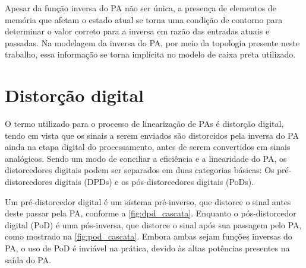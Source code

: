 Apesar da função inversa do PA não ser única, a presença de elementos de memória que afetam o estado atual se torna uma condição de contorno para determinar o valor correto para a inversa em razão das entradas atuais e passadas. Na modelagem da inversa do PA, por meio da topologia presente neste trabalho, essa informação se torna implícita no modelo de caixa preta utilizado.

\section{Distorção digital} \label{sec:fundteo-distor}
O termo utilizado para o processo de linearização de PAs é distorção digital, tendo em vista que os sinais a serem enviados são distorcidos pela inversa do PA ainda na etapa digital do processamento, antes de serem convertidos em sinais analógicos. Sendo um modo de conciliar a eficiência e a linearidade do PA, os distorcedores digitais podem ser separados em duas categorias básicas: Os pré-distorcedores digitais (DPDs) e os pós-distorcedores digitais (PoDs).

Um pré-distorcedor digital é um sistema pré-inverso, que distorce o sinal antes deste passar pela PA, conforme a \autoref{fig:dpd_cascata}. Enquanto o pós-distorcedor digital (PoD) é uma pós-inversa, que distorce o sinal após sua passagem pelo PA, como mostrado na \autoref{fig:pod_cascata}. Embora ambas sejam funções inversas do PA, o uso de PoD é inviável na prática, devido às altas potências presentes na saída do PA.



